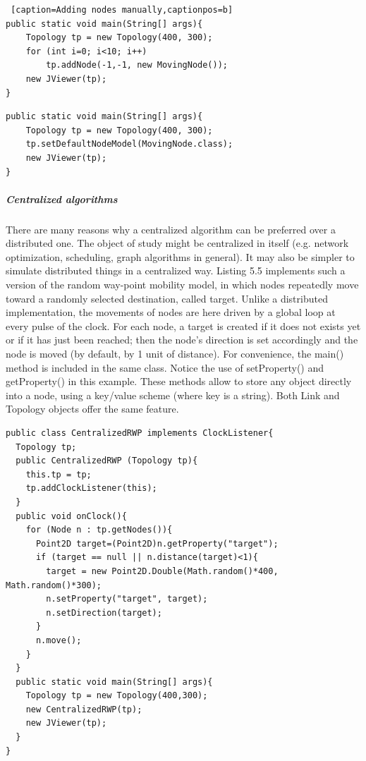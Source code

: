 \begin{lstlisting} [caption=Adding nodes manually,captionpos=b]
public static void main(String[] args){
	Topology tp = new Topology(400, 300);
	for (int i=0; i<10; i++)
		tp.addNode(-1,-1, new MovingNode());
	new JViewer(tp);
}
\end{lstlisting}

\begin{lstlisting}[caption=Using a defined node as default, captionpos=b]
public static void main(String[] args){
	Topology tp = new Topology(400, 300);
	tp.setDefaultNodeModel(MovingNode.class);
	new JViewer(tp);
}
\end{lstlisting}


\subparagraph{Centralized algorithms}There are many reasons why a centralized algorithm can be preferred over a distributed one. The object of study might be centralized in itself (e.g. network optimization, scheduling, graph algorithms in general). It may also be simpler to simulate distributed things in a centralized way. Listing 5.5 implements such a version of the random way-point mobility model, in which nodes repeatedly move toward a randomly selected destination, called target. Unlike a distributed implementation, the movements of nodes are here driven by a global loop at every pulse of the clock. For each node, a target is created if it does not exists yet or if it has just been reached; then the node’s direction is set accordingly and the node is moved (by default, by 1 unit of distance). For convenience, the main() method is included in the same class. Notice the use of setProperty() and getProperty() in this example. These methods allow to store any object directly into a node, using a key/value scheme (where key is a string). Both Link and Topology objects offer the same feature.
\begin{lstlisting}[caption=Example of a mobility trace recorder, captionpos=b]
public class CentralizedRWP implements ClockListener{
  Topology tp;
  public CentralizedRWP (Topology tp){
    this.tp = tp;
    tp.addClockListener(this);
  }
  public void onClock(){
    for (Node n : tp.getNodes()){
      Point2D target=(Point2D)n.getProperty("target");
      if (target == null || n.distance(target)<1){
        target = new Point2D.Double(Math.random()*400, Math.random()*300);
        n.setProperty("target", target);
        n.setDirection(target);
      }
      n.move();
    }
  }
  public static void main(String[] args){
    Topology tp = new Topology(400,300);
    new CentralizedRWP(tp);
    new JViewer(tp);
  }
}
\end{lstlisting}
